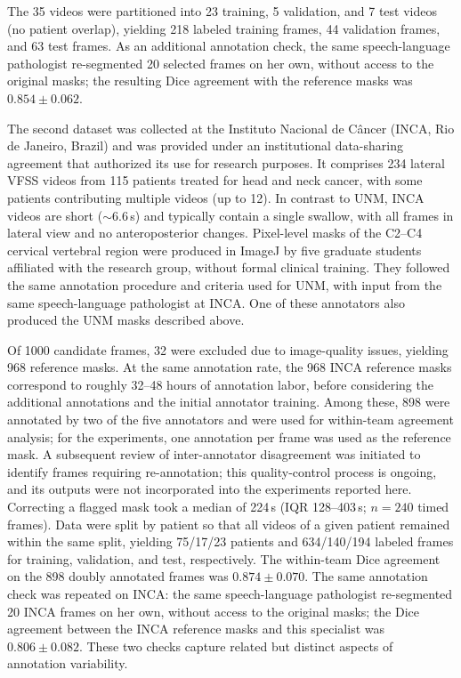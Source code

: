 \documentclass[
  msc,
  american
]{ThesisPUC_v2}
\begin{document}
The 35 videos were partitioned into 23 training, 5 validation, and 7 test videos (no patient overlap), yielding 218 labeled training frames, 44 validation frames, and 63 test frames. As an additional annotation check, the same speech-language pathologist re-segmented 20 selected frames on her own, without access to the original masks; the resulting Dice agreement with the reference masks was $0.854 \pm 0.062$.

The second dataset was collected at the Instituto Nacional de C\^ancer (INCA, Rio de Janeiro, Brazil) and was provided under an institutional data-sharing agreement that authorized its use for research purposes. It comprises 234 lateral VFSS videos from 115 patients treated for head and neck cancer, with some patients contributing multiple videos (up to 12). In contrast to UNM, INCA videos are short ($\sim$6.6\,s) and typically contain a single swallow, with all frames in lateral view and no anteroposterior changes. Pixel-level masks of the C2--C4 cervical vertebral region were produced in ImageJ by five graduate students affiliated with the research group, without formal clinical training. They followed the same annotation procedure and criteria used for UNM, with input from the same speech-language pathologist at INCA. One of these annotators also produced the UNM masks described above.

Of 1000 candidate frames, 32 were excluded due to image-quality issues, yielding 968 reference masks. At the same annotation rate, the 968 INCA reference masks correspond to roughly 32--48 hours of annotation labor, before considering the additional annotations and the initial annotator training. Among these, 898 were annotated by two of the five annotators and were used for within-team agreement analysis; for the experiments, one annotation per frame was used as the reference mask. A subsequent review of inter-annotator disagreement was initiated to identify frames requiring re-annotation; this quality-control process is ongoing, and its outputs were not incorporated into the experiments reported here. Correcting a flagged mask took a median of 224\,s (IQR 128--403\,s; $n = 240$ timed frames). Data were split by patient so that all videos of a given patient remained within the same split, yielding 75/17/23 patients and 634/140/194 labeled frames for training, validation, and test, respectively. The within-team Dice agreement on the 898 doubly annotated frames was $0.874 \pm 0.070$. The same annotation check was repeated on INCA: the same speech-language pathologist re-segmented 20 INCA frames on her own, without access to the original masks; the Dice agreement between the INCA reference masks and this specialist was $0.806 \pm 0.082$. These two checks capture related but distinct aspects of annotation variability.
\end{document}
